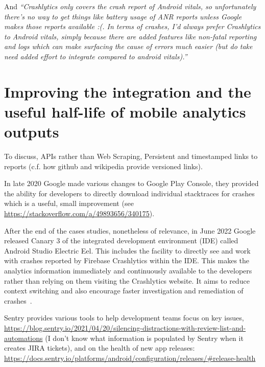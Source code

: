 And \emph{``Crashlytics only covers the crash report of Android vitals, so unfortunately there's no way to get things like battery usage of ANR reports unless Google makes those reports available :(. In terms of crashes, I'd always prefer Crashlytics to Android vitals, simply because there are added features like non-fatal reporting and logs which can make surfacing the cause of errors much easier (but do take need added effort to integrate compared to android vitals).''}

\section{Improving the integration and the useful half-life of mobile analytics outputs}
To discuss, APIs rather than Web Scraping, Persistent and timestamped links to reports (c.f. how github and wikipedia provide versioned links).

In late 2020 Google made various changes to Google Play Console, they provided the ability for developers to directly download individual stacktraces for crashes~\citep{stackoverflow2018_how_can_i_get_app_crash_log_from_google_play_console} which is a useful, small improvement (see \url{https://stackoverflow.com/a/49893656/340175}).

After the end of the cases studies, nonetheless of relevance, in June 2022 Google released Canary 3 of the integrated development environment (IDE) called Android Studio Electric Eel. This includes the facility to directly see and work with crashes reported by Firebase Crashlytics within the IDE. This makes the analytics information immediately and continuously available to the developers rather than relying on them visiting the Crashlytics website. It aims to reduce context switching and also encourage faster investigation and remediation of crashes~\citep{android2022_firebase_crash_integration_into_android_studio_electric_eel}.


Sentry provides various tools to help development teams focus on key issues,  \url{https://blog.sentry.io/2021/04/20/silencing-distractions-with-review-list-and-automations} (I don't know what information is populated by Sentry when it creates JIRA tickets),  and on the health of new app releases: \url{https://docs.sentry.io/platforms/android/configuration/releases/#release-health}


